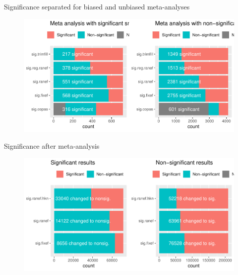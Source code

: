 \documentclass[english]{beamer}\usepackage[]{graphicx}\usepackage[]{color}
\makeatletter
\def\maxwidth{ %
  \ifdim\Gin@nat@width>\linewidth
    \linewidth
  \else
    \Gin@nat@width
  \fi
}
\newenvironment{knitrout}{}{} %
\makeatother
\begin{document}
\begin{frame}{Significance separated for biased and unbiased meta-analyses}

\begin{figure}[fragile]
\begin{knitrout}
\color{fgcolor}
\includegraphics[width=\maxwidth]{figure/unnamed-chunk-11-1} 

\end{knitrout}
\end{figure}
\end{frame}


\begin{frame}{Significance after meta-analysis}

\begin{figure}[fragile]
\begin{knitrout}
\color{fgcolor}
\includegraphics[width=\maxwidth]{figure/unnamed-chunk-12-1} 

\end{knitrout}
\end{figure}
\end{frame}
\end{document}
